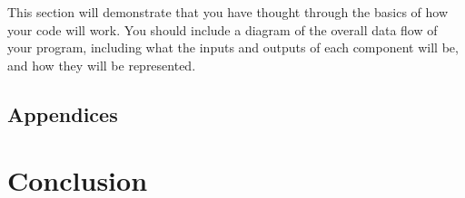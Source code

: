 \documentclass[10pt,twocolumn]{article}
\begin{document}
This section will demonstrate that you have thought through the basics of how your code will work. You should include a diagram of the overall data flow of your program, including what the inputs and outputs of each component will be, and how they will be represented.

\subsection{Appendices}

\section{Conclusion}

\printbibliography 
\end{document}
